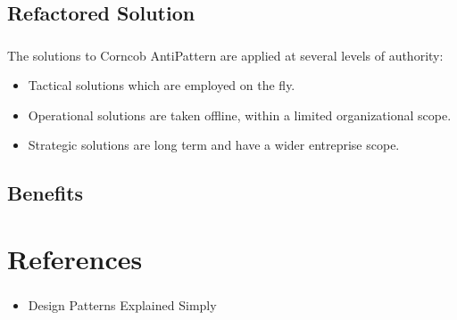 \documentclass{beamer}
\begin{document}
\subsection{Refactored Solution}
\begin{frame}
\frametitle{}
The solutions to Corncob AntiPattern are applied at several levels of authority:
\begin{itemize}
\item Tactical solutions which are employed on the fly.
\item Operational solutions are taken offline, within a limited organizational scope.
\item Strategic solutions are long term and have a wider entreprise scope.
\end{itemize}

\end{frame}
\subsection{Benefits}
\begin{frame}
\frametitle{}
\end{frame}
\section{References}
\begin{frame}
\frametitle{}
\begin{itemize}
\item Design Patterns Explained Simply
\end{itemize}

\end{frame}
\end{document}
